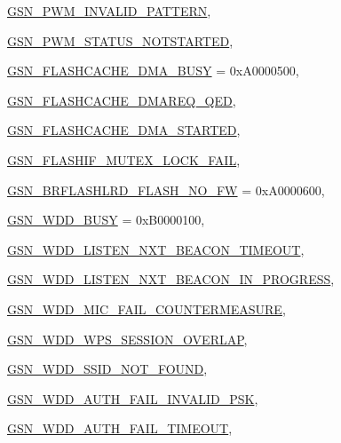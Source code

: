 \begin{DoxyCompactItemize}
\par
\hyperlink{a00659_gga476ae1caf992f8287176b2cc414c8707a5aa4c16091395243516364657aff2fe9}{GSN\_\-PWM\_\-INVALID\_\-PATTERN}, 
\par
\hyperlink{a00659_gga476ae1caf992f8287176b2cc414c8707a95a7a7b5c092515d04c24c6388e9905c}{GSN\_\-PWM\_\-STATUS\_\-NOTSTARTED}, 
\par
\hyperlink{a00659_gga476ae1caf992f8287176b2cc414c8707ad021dcbdc8e141eed8f82badd8bf12b4}{GSN\_\-FLASHCACHE\_\-DMA\_\-BUSY} =  0xA0000500, 
\par
\hyperlink{a00659_gga476ae1caf992f8287176b2cc414c8707ac38623a21b92fe4732336265f1af2fcf}{GSN\_\-FLASHCACHE\_\-DMAREQ\_\-QED}, 
\par
\hyperlink{a00659_gga476ae1caf992f8287176b2cc414c8707a5c9613626f43ec72e0d76dc99b699d2c}{GSN\_\-FLASHCACHE\_\-DMA\_\-STARTED}, 
\par
\hyperlink{a00659_gga476ae1caf992f8287176b2cc414c8707aa282f94d90cedc1d3a198026cb052218}{GSN\_\-FLASHIF\_\-MUTEX\_\-LOCK\_\-FAIL}, 
\par
\hyperlink{a00659_gga476ae1caf992f8287176b2cc414c8707aeee05439ac123ff8e591714cb9c89a44}{GSN\_\-BRFLASHLRD\_\-FLASH\_\-NO\_\-FW} =  0xA0000600, 
\par
\hyperlink{a00659_gga476ae1caf992f8287176b2cc414c8707a4d536d2369771fb198475b0431b77c90}{GSN\_\-WDD\_\-BUSY} =  0xB0000100, 
\par
\hyperlink{a00659_gga476ae1caf992f8287176b2cc414c8707ae4e500af9a63d9892265ebe5d7131544}{GSN\_\-WDD\_\-LISTEN\_\-NXT\_\-BEACON\_\-TIMEOUT}, 
\par
\hyperlink{a00659_gga476ae1caf992f8287176b2cc414c8707a7d29b0c6df61d8c975f0dfc1380235cd}{GSN\_\-WDD\_\-LISTEN\_\-NXT\_\-BEACON\_\-IN\_\-PROGRESS}, 
\par
\hyperlink{a00659_gga476ae1caf992f8287176b2cc414c8707a39a1d90a1788404b1e5751a3ffd547f4}{GSN\_\-WDD\_\-MIC\_\-FAIL\_\-COUNTERMEASURE}, 
\par
\hyperlink{a00659_gga476ae1caf992f8287176b2cc414c8707ab2321655a5c470b9ff45d82e8391f309}{GSN\_\-WDD\_\-WPS\_\-SESSION\_\-OVERLAP}, 
\par
\hyperlink{a00659_gga476ae1caf992f8287176b2cc414c8707a6a629838a54b64ede667d8a1b9c5adf4}{GSN\_\-WDD\_\-SSID\_\-NOT\_\-FOUND}, 
\par
\hyperlink{a00659_gga476ae1caf992f8287176b2cc414c8707ac3620a5c96c62e4658076868851218db}{GSN\_\-WDD\_\-AUTH\_\-FAIL\_\-INVALID\_\-PSK}, 
\par
\hyperlink{a00659_gga476ae1caf992f8287176b2cc414c8707a725564e28dca7eb97907f548b0f40dd6}{GSN\_\-WDD\_\-AUTH\_\-FAIL\_\-TIMEOUT}, 

\end{DoxyCompactItemize}
